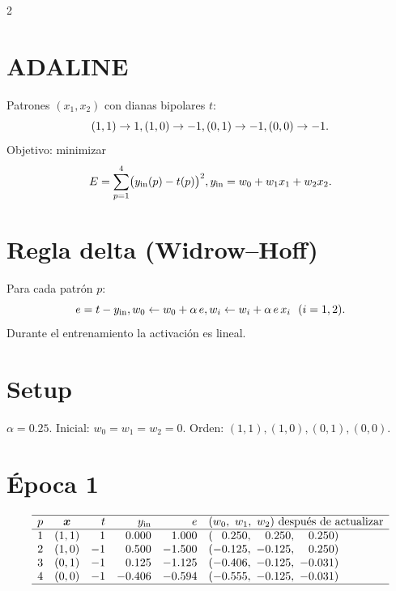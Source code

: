 \documentclass[11pt]{article}
\begin{document}
\begin{multicols}{2}
\newpage
\section*{ADALINE}
Patrones $(x_1,x_2)$ con dianas bipolares $t$:
\[
(1,1)\to 1,\\ (1,0)\to -1,\\ (0,1)\to -1,\\ (0,0)\to -1.
\]
Objetivo: minimizar
\[
E=\sum_{p=1}^4\bigl(y_{\text{in}}(p)-t(p)\bigr)^2,
\\
y_{\text{in}}=w_0+w_1x_1+w_2x_2.
\]

\section*{Regla delta (Widrow--Hoff)}
Para cada patrón $p$:
\[
e=t-y_{\text{in}},\\
w_0\leftarrow w_0+\alpha\,e,\\
w_i\leftarrow w_i+\alpha\,e\,x_i\ \ (i=1,2).
\]
Durante el entrenamiento la activación es lineal.

\section*{Setup}
$\alpha=0.25$. Inicial: $w_0=w_1=w_2=0$. Orden: $(1,1),(1,0),(0,1),(0,0)$.

\section*{Época 1}
\begingroup\small
\[
\begin{array}{c@{\quad}c@{\quad}r@{\quad}r@{\quad}r@{\quad}l}
\hline
p & \bm{x} & t & y_{\text{in}} & e & (w_0,\ w_1,\ w_2)\ \text{después de actualizar}\\
\hline
1 & (1,1) & \phantom{-}1  & \phantom{-}0.000 & \phantom{-}1.000 & ( \phantom{-}0.250,\ \phantom{-}0.250,\ \phantom{-}0.250)\\
2 & (1,0) & -1            & \phantom{-}0.500 & -1.500           & (-0.125,\ -0.125,\ \phantom{-}0.250)\\
3 & (0,1) & -1            & \phantom{-}0.125 & -1.125           & (-0.406,\ -0.125,\ -0.031)\\
4 & (0,0) & -1            & -0.406           & -0.594           & (-0.555,\ -0.125,\ -0.031)\\
\hline
\end{array}
\]
\endgroup


\end{multicols}
\end{document}
